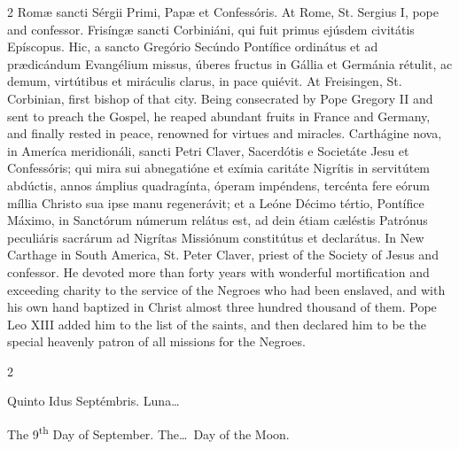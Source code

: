 \begin{paracol}{2}
\switchcolumn*
{}
Romæ sancti Sérgii 
 Primi, Papæ et Confessóris.
\switchcolumn
{}
At Rome, St. Sergius I, pope and 
 confessor.
\switchcolumn*
{}
Frisíngæ sancti 
 Corbiniáni, qui fuit primus ejúsdem civitátis Epíscopus. Hic, a sancto 
 Gregório Secúndo Pontífice ordinátus et ad prædicándum Evangélium missus, 
 úberes fructus in Gállia et Germánia rétulit, ac demum, virtútibus et 
 miráculis clarus, in pace quiévit.
\switchcolumn
{}
At Freisingen, St. Corbinian, first 
 bishop of that city. Being consecrated by Pope Gregory II and sent to 
 preach the Gospel, he reaped abundant fruits in France and Germany, and 
 finally rested in peace, renowned for virtues and miracles.
\switchcolumn*
{}
Carthágine nova, in 
 Ameríca meridionáli, sancti Petri Claver, Sacerdótis e Societáte Jesu et 
 Confessóris; qui mira sui abnegatióne et exímia caritáte Nigrítis in 
 servitútem abdúctis, annos ámplius quadragínta, óperam impéndens, tercénta 
 fere eórum míllia Christo sua ipse manu regenerávit; et a Leóne Décimo 
 tértio, Pontífice Máximo, in Sanctórum númerum relátus est, ad dein étiam 
 cæléstis Patrónus peculiáris sacrárum ad Nigrítas Missiónum constitútus et 
 declarátus.
\switchcolumn
{}
In New Carthage in South America, 
 St. Peter Claver, priest of the Society of Jesus and confessor. He 
 devoted more than forty years with wonderful mortification and exceeding 
 charity to the service of the Negroes who had been enslaved, and with his 
 own hand baptized in Christ almost three hundred thousand of them. 
 Pope Leo XIII added him to the list of the saints, and then declared him to 
 be the special heavenly patron of all missions for the Negroes.
\switchcolumn*
{}
\end{paracol}


\begin{paracol}{2}
\begin{center}{\color{gregoriocolor} Quinto Idus Septémbris. 
 Luna\dots\ }\end{center}
\switchcolumn
{}
\begin{center}{\color{gregoriocolor} The   9\textsuperscript{th} Day of 
 September. The\dots\ Day of the Moon.}\end{center}
\end{paracol}

